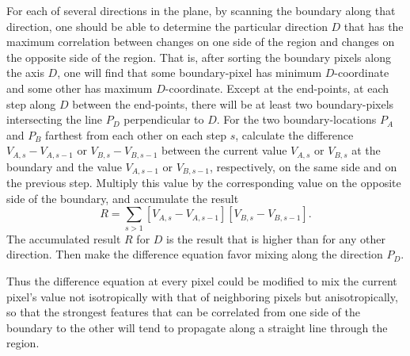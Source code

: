 \documentclass{article}
\begin{document}
For each of several directions in the plane, by scanning the boundary along
that direction, one should be able to determine the particular direction $D$
that has the maximum correlation between changes on one side of the region and
changes on the opposite side of the region.  That is, after sorting the
boundary pixels along the axis $D$, one will find that some boundary-pixel has
minimum $D$-coordinate and some other has maximum $D$-coordinate.  Except at
the end-points, at each step along $D$ between the end-points, there will be at
least two boundary-pixels intersecting the line $P_D$ perpendicular to $D$.
For the two boundary-locations $P_A$ and $P_B$ farthest from each other on each
step $s$, calculate the difference $V_{A,s} - V_{A,s-1}$ or $V_{B,s} -
V_{B,s-1}$ between the current value $V_{A,s}$ or $V_{B,s}$ at the boundary and
the value $V_{A,s-1}$ or $V_{B,s-1}$, respectively, on the same side and on the
previous step.  Multiply this value by the corresponding value on the opposite
side of the boundary, and accumulate the result
\begin{equation}
   R = \sum_{s > 1} \left[V_{A,s} - V_{A,s-1}\right] \left[V_{B,s} -
   V_{B,s-1}\right].
\end{equation}
The accumulated result $R$ for $D$ is the result that is higher than for any
other direction.  Then make the difference equation favor mixing along the
direction $P_D$.

Thus the difference equation at every pixel could be modified to mix the
current pixel's value not isotropically with that of neighboring pixels but
anisotropically, so that the strongest features that can be correlated from one
side of the boundary to the other will tend to propagate along a straight line
through the region.
\end{document}
